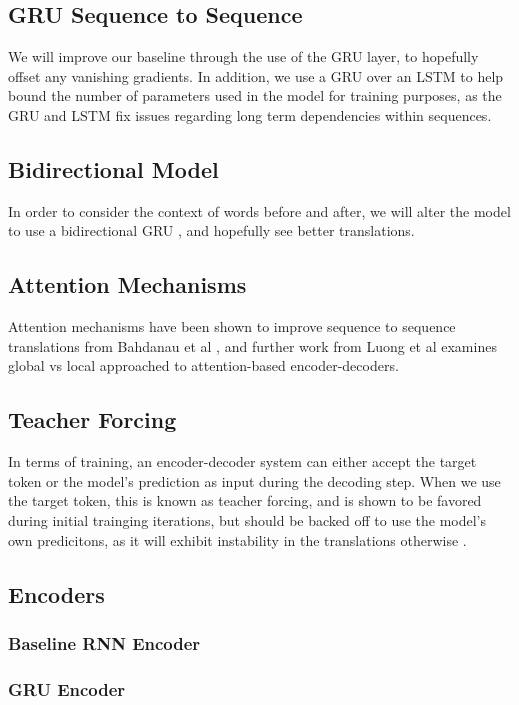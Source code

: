 \documentclass[twoside,twocolumn]{article}
\begin{document}
\subsection{GRU Sequence to Sequence}
We will improve our baseline through the use of the GRU layer, to hopefully
offset any vanishing gradients. In addition, we use a GRU over an LSTM to help
bound the number of parameters used in the model for training purposes, as the
GRU and LSTM fix issues regarding long term dependencies within sequences.
\subsection{Bidirectional Model}
In order to consider the context of words before and after, we will alter the
model to use a bidirectional GRU \cite{bahdanau2014neural}, and hopefully see
better translations.
\subsection{Attention Mechanisms}
Attention mechanisms have been shown to improve sequence to sequence
translations from Bahdanau et al \cite{bahdanau2014neural}, and further work
from Luong et al \cite{luong2015effective} examines global vs local approached
to attention-based encoder-decoders.
\subsection{Teacher Forcing}
In terms of training, an encoder-decoder system can either accept the target
token or the model's prediction as input during the decoding step. When we use
the target token, this is known as teacher forcing, and is shown to be favored
during initial trainging iterations, but should be backed off to use the
model's own predicitons, as it will exhibit instability in the translations
otherwise \cite{lamb2016professor}.

\subsection{Encoders}
\subsubsection{Baseline RNN Encoder}
\subsubsection{GRU Encoder}
\end{document}
